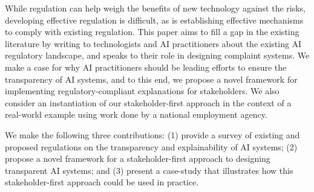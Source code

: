 While regulation can help weigh the benefits of new technology against the risks, developing  effective regulation is difficult, as is establishing effective mechanisms to comply with existing regulation. This paper aims to fill a gap in the existing literature by writing to technologists and AI practitioners about the existing AI regulatory landscape, and speaks to their role in designing complaint systems. We make a case for why AI practitioners should be leading efforts to ensure the transparency of AI systems, and to this end, we propose a novel framework for implementing regulatory-compliant explanations for stakeholders. We also consider an instantiation of our stakeholder-first approach in the context of a real-world example using work done by a national employment agency.

We make the following three contributions: (1) provide a survey of existing and proposed regulations on the transparency and explainability of AI systems; (2) propose a novel framework for a stakeholder-first approach to designing transparent AI systems; and (3) present a case-study that illustrates how this stakeholder-first approach could be used in practice.



